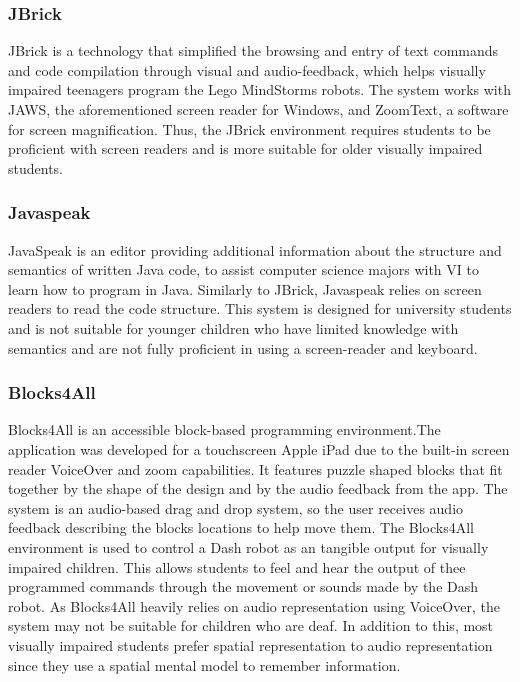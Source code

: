 \documentclass[oneside,%
                    author={Malak Hajji},
                    degree={BSc},
                    title={Designing An Accessible Computational Toolkit For Students},
                  subtitle={With Mixed Visual Abilities}]{dissertation}
\begin{document}
\subsubsection{JBrick}
JBrick\cite{jbrick} is a technology that simplified the browsing and entry of text commands and code compilation through visual and audio-feedback, which helps visually impaired teenagers program the Lego MindStorms robots. The system works with JAWS, the aforementioned screen reader for Windows, and ZoomText, a software for screen magnification. Thus, the JBrick environment requires students to be proficient with screen readers and is more suitable for older visually impaired students.

\subsubsection{Javaspeak}
JavaSpeak\cite{javaspeak} is an editor providing additional information about the structure and semantics of written Java code, to assist computer science majors with VI to learn how to program in Java. Similarly to JBrick\cite{jbrick}, Javaspeak  relies on screen readers to read the code structure. This system is designed for university students and is not suitable for younger children who have limited knowledge with semantics and are not fully proficient in using a screen-reader and keyboard.

\subsubsection{Blocks4All}
Blocks4All is an accessible block-based programming environment\cite{blocksforall}.The application was developed for a touchscreen Apple iPad due to the built-in screen reader VoiceOver and zoom capabilities. It features puzzle shaped blocks that fit together by the shape of the design and by the audio feedback from the app. The system is an audio-based drag and drop system, so the user receives audio feedback describing the blocks locations to help move them. The Blocks4All environment is used to control a Dash robot as an tangible output for visually impaired children. This allows students to feel and hear the output of thee programmed commands through the movement or sounds made by the Dash robot. As Blocks4All heavily relies on audio representation using VoiceOver, the system may not be suitable for children who are deaf. In addition to this, most visually impaired students prefer spatial representation to audio representation since they use a spatial mental model to remember information.
\end{document}
